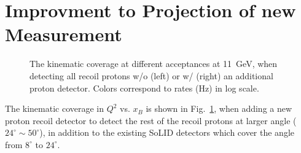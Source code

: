 

\section{Improvment to Projection of new Measurement}
\begin{figure}[!ht]
 \begin{center}
 \caption[The kinematic coverage at different acceptances.]{\footnotesize{The
     kinematic coverage at different acceptances at 11~GeV, when detecting all
recoil protons w/o (left) or w/ (right) an additional proton detector. Colors correspond to rates
(Hz) in log scale.}}
  \label{kin_cor_prd}
  \end{center}
\end{figure}
The kinematic coverage in $Q^{2}$ vs. $x_{B}$ is shown in Fig.~\ref{kin_cor_prd},
when adding a new proton recoil detector to detect the rest of the recoil
protons at larger angle ($24^{\circ}\sim50^{\circ}$), in addition to the existing SoLID detectors which cover the angle from  $8^{\circ}$ to $24^{\circ}$.


